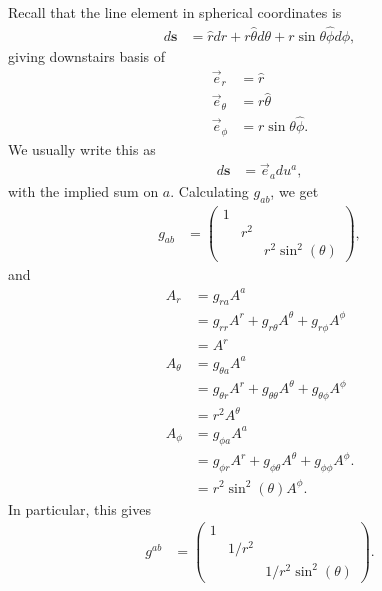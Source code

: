 \documentclass[10pt]{mypackage}
\begin{document}
  \begin{example}
    Recall that the line element in spherical coordinates is
    \begin{align*}
      d\mathbf{s} &= \hat{r}dr + r\hat{\theta} d\theta + r\sin\theta\hat{\phi}d\phi,
    \end{align*}
    giving downstairs basis of
    \begin{align*}
      \vec{e}_r &= \hat{r}\\
      \vec{e}_{\theta} &= r\hat{\theta}\\
      \vec{e}_{\phi} &= r\sin\theta \hat{\phi}.
    \end{align*}
    We usually write this as
    \begin{align*}
      d\mathbf{s} &= \vec{e}_adu^{a},
    \end{align*}
    with the implied sum on $a$. Calculating $g_{ab}$, we get
    \begin{align*}
      g_{ab} &= \begin{pmatrix}1 & & \\ & r^2 & \\ & & r^2\sin^2\left( \theta \right)\end{pmatrix},
    \end{align*}
    and 
    \begin{align*}
      A_r &= g_{ra}A^{a}\\
          &= g_{rr}A^{r} + g_{r\theta}A^{\theta} + g_{r\phi}A^{\phi}\\
          &= A^{r}\\
      A_{\theta} &= g_{\theta a}A^{a}\\
                 &= g_{\theta r}A^{r} + g_{\theta \theta}A^{\theta} + g_{\theta \phi}A^{\phi}\\
                 &= r^2A^{\theta}\\
      A_{\phi} &= g_{\phi a}A^{a}\\
               &= g_{\phi r}A^{r} + g_{\phi \theta}A^{\theta} + g_{\phi \phi}A^{\phi}.\\
               &= r^2\sin^2\left( \theta \right)A^{\phi}.
    \end{align*}
    In particular, this gives
    \begin{align*}
      g^{ab} &= \begin{pmatrix}1 & & \\ & 1/r^2 & \\ & & 1/r^2\sin^2\left( \theta \right)\end{pmatrix}.
    \end{align*}

\end{example}
\end{document}
